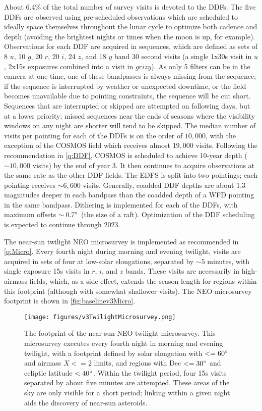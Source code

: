 \hangindent=0.7cm About 6.4\% of the total number of survey visits is devoted to the DDFs. The five DDFs are observed using pre-scheduled observations which are scheduled to ideally space themselves throughout the lunar cycle to optimize both cadence and depth (avoiding the brightest nights or times when the moon is up, for example). Observations for each DDF are acquired in sequences, which are defined as sets of 8 $u$, 10 $g$, 20 $r$, 20 $i$, 24 $z$, and 18 $y$ band 30 second visits (a single 1x30s visit in $u$, 2x15s exposures combined into a visit in $grizy$). As only 5 filters can be in the camera at one time, one of these bandpasses is always missing from the sequence; if the sequence is interrupted by weather or unexpected downtime, or the field becomes unavailable due to pointing constraints, the sequence will be cut short. Sequences that are interrupted or skipped are attempted on following days, but at a lower priority; missed sequences near the ends of seasons where the visibility windows on any night are shorter will tend to be skipped. The median number of visits per pointing for each of the DDFs is on the order of $10,000$, with the exception of the COSMOS field which receives almost $19,000$ visits. Following the recommendation in \autoref{q:DDF}, COSMOS is scheduled to achieve 10-year depth ($\sim10,000$ visits) by the end of year 3. It then continues to acquire observations at the same rate as the other DDF fields. The EDFS is split into two pointings; each pointing receives $\sim6,600$ visits. Generally, coadded DDF depths are about 1.3 magnitudes deeper in each bandpass than the coadded depth of a WFD pointing in the same bandpass. Dithering is implemented for each of the DDFs, with maximum offsets $\sim0.7^{\circ}$ (the size of a raft). Optimization of the DDF scheduling is expected to continue through 2023.

\hangindent=0.7cm The near-sun twilight NEO microsurvey is implemented as recommended in \autoref{q:Micro}. Every fourth night during morning and evening twilight, visits are acquired in sets of four at low-solar elongations, separated by $\sim5$ minutes, with single exposure 15s visits in $r$, $i$, and $z$ bands. These visits are necessarily in high-airmass fields, which, as a side-effect, extends the season length for regions within this footprint (although with somewhat shallower visits). The NEO microsurvey footprint is shown in \autoref{fig:baselinev3Micro}.

\begin{figure*}[t!]
    \centering
    \texttt{[image: figures/v3TwilightMicrosurvey.png]}
    \caption{The footprint of the near-sun NEO twilight microsurvey. This microsurvey executes every fourth night in morning and evening twilight, with a footprint defined by solar elongation with $<=60^{\circ}$ and airmass $X<=2$ limits, and regions with Dec $<= 30^{\circ}$ and ecliptic latitude $< 40^{\circ}$. Within the twilight period, four 15s visits separated by about five minutes are attempted. These areas of the sky are only visible for a short period; linking within a given night aids the discovery of near-sun asteroids. }\label{fig:baselinev3Micro}
\end{figure*}
